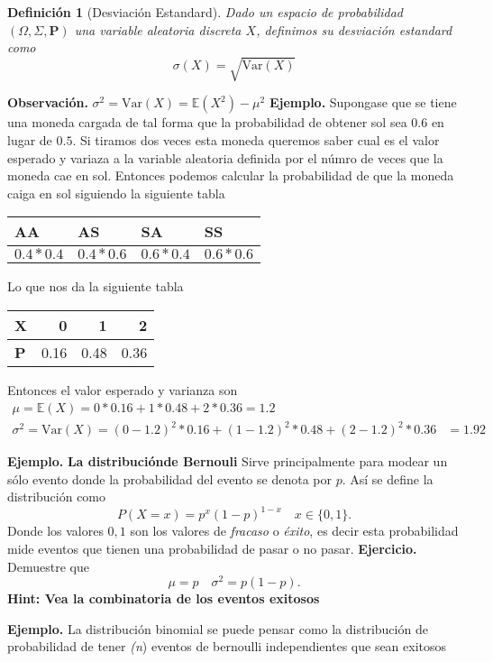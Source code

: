 \documentclass[letterpaper]{book}
\newtheorem{def.}{Definici\'on}[section]
\newcommand{\prob}{\textbf{P}}
\newcommand{\esp}{\mathbb E}
\newcommand{\eje}{{\newline \noindent \sc \textbf{Ejercicio. }}}
\newcommand{\exe}{{\newline \noindent \sc \textbf{Ejemplo. }}}
\newcommand{\obs}{{\newline \noindent \sc \textbf{Observación. }}}
\newcommand{\om}{\ensuremath{\Omega}}
\newcommand{\sig}{\ensuremath{\Sigma}}
\begin{document}
\begin{def.}[Desviación Estandard]
Dado un espacio de probabilidad \((\om,\sig,\prob)\) una variable aleatoria discreta \(X\), definimos su \emph{desviación estandard} como
\[
    \sigma(X)=\sqrt{\mathrm{Var}(X)}
\]
\end{def.}

\obs \(\sigma^2=\mathrm{Var}(X)=\esp(X^2)-\mu^2\)
\exe Supongase que se tiene una moneda cargada de tal forma que la probabilidad de obtener sol sea \(0.6\) en lugar de \(0.5\). Si tiramos dos veces esta moneda queremos saber cual es el valor esperado y variaza a la variable aleatoria definida por el númro de veces que la moneda cae en sol. Entonces podemos calcular la probabilidad de que la moneda caiga en sol siguiendo la siguiente tabla
\begin{center}
\begin{tabular}{llll}
AA & AS & SA & SS\\
\hline
\(0.4*0.4\) & \(0.4*0.6\) & \(0.6*0.4\) & \(0.6*0.6\)\\
\end{tabular}
\end{center}
Lo que nos da la siguiente tabla
\begin{center}
\begin{tabular}{lrrr}
X & 0 & 1 & 2\\
\hline
\textbf{P} & 0.16 & 0.48 & 0.36\\
\end{tabular}
\end{center}
Entonces el valor esperado y varianza son
\begin{align*}
    \mu=\esp(X)= 0*0.16+1*0.48+2*0.36=1.2\\
    \sigma^2=\mathrm{Var}(X)=(0-1.2)^2*0.16+(1-1.2)^2*0.48+(2-1.2)^2*0.36&=1.92
\end{align*}

\exe \textbf{La distribuciónde Bernouli} Sirve principalmente para modear un sólo evento donde la probabilidad del evento se denota por \(p\). Así se define la distribución como
\[
    P(X=x)=p^{x}(1-p)^{1-x}\quad x\in\{0,1\}.
\]
\noindent Donde los valores \(0,1\) son los valores de \emph{fracaso} o \emph{éxito}, es decir esta probabilidad mide eventos que tienen una probabilidad de pasar o no pasar.
\eje Demuestre que
\[
    \mu=p\quad\sigma^2=p(1-p).
\]
\textbf{Hint: Vea la combinatoria de los eventos exitosos}


\exe La distribución binomial se puede pensar como la distribución de probabilidad de tener \emph{(n}) eventos de bernoulli independientes que sean exitosos
\end{document}
